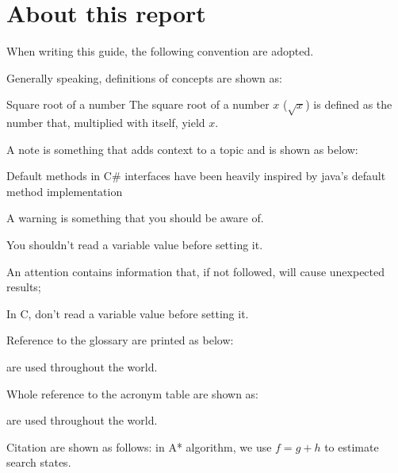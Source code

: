 \chapter{About this report}

When writing this guide, the following convention are adopted.

Generally speaking, definitions of concepts are shown as:

\begin{definition}{Square root of a number}
    The square root of a number $x$ ($\sqrt{x}$) is defined as the number that, multiplied with itself, yield $x$.
\end{definition}

A note is something that adds context to a topic and is shown as below:

\begin{info}
    Default methods in C\# interfaces have been heavily inspired by java's default method implementation
\end{info}

A warning is something that you should be aware of.

\begin{warning}
    You shouldn't read a variable value before setting it.
\end{warning}

An attention contains information that, if not followed, will cause unexpected results;

\begin{attention}
    In C, don't read a variable value before setting it.
\end{attention}

Reference to the glossary are printed as below:

 are used throughout the world.

Whole reference to the acronym table are shown as:

 are used throughout the world.

Citation are shown as follows: in A* algorithm, we use $f=g+h$ to estimate search states\cite{hart1968-astar}.
